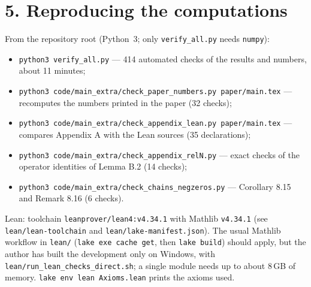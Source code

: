 \documentclass[10pt]{article}
\begin{document}
\section*{5. Reproducing the computations}
From the repository root (Python~3; only \texttt{verify\_all.py} needs \texttt{numpy}):
\begin{itemize}
\item \texttt{python3 verify\_all.py} --- 414 automated checks of the results and numbers, about 11 minutes;
\item \texttt{python3 code/main\_extra/check\_paper\_numbers.py paper/main.tex} --- recomputes the numbers printed in the paper (32 checks);
\item \texttt{python3 code/main\_extra/check\_appendix\_lean.py paper/main.tex} --- compares Appendix A with the Lean sources (35 declarations);
\item \texttt{python3 code/main\_extra/check\_appendix\_relN.py} --- exact checks of the operator identities of Lemma B.2 (14 checks);
\item \texttt{python3 code/main\_extra/check\_chains\_negzeros.py} --- Corollary 8.15 and Remark 8.16 (6 checks).
\end{itemize}
\begin{sloppypar}
Lean: toolchain \texttt{leanprover/lean4:v4.34.1} with Mathlib \texttt{v4.34.1} (see \texttt{lean/lean-toolchain} and \texttt{lean/lake-manifest.json}). The usual Mathlib workflow in \texttt{lean/} (\texttt{lake exe cache get}, then \texttt{lake build}) should apply, but the author has built the development only on Windows, with \texttt{lean/run\_lean\_checks\_direct.sh}; a single module needs up to about 8\,GB of memory. \texttt{lake env lean Axioms.lean} prints the axioms used.
\end{sloppypar}
\end{document}
